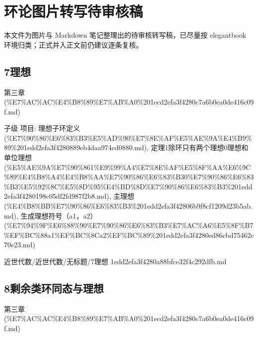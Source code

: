 \chapter{环论图片转写待审核稿}

\begin{dxtips}

本文件为图片与 Markdown 笔记整理出的待审核转写稿，已尽量按 elegantbook 环境归类；正式并入正文前仍建议逐条复核。

\end{dxtips}

\section*{7理想}

\begin{note}[来源上级主题]

第三章 (\%E7\%AC\%AC\%E4\%B8\%89\%E7\%AB\%A0\%201ecd2efa3f4280c7a6b0ea0de416c09f.md)

\end{note}

\begin{note}[7理想]

子级 项目: 理想子环定义 (\%E7\%90\%86\%E6\%83\%B3\%E5\%AD\%90\%E7\%8E\%AF\%E5\%AE\%9A\%E4\%B9\%89\%201edd2efa3f4280889eb4daa974cd0880.md), 定理1除环只有两个理想0理想和单位理想 (\%E5\%AE\%9A\%E7\%90\%861\%E9\%99\%A4\%E7\%8E\%AF\%E5\%8F\%AA\%E6\%9C\%89\%E4\%B8\%A4\%E4\%B8\%AA\%E7\%90\%86\%E6\%83\%B30\%E7\%90\%86\%E6\%83\%B3\%E5\%92\%8C\%E5\%8D\%95\%E4\%BD\%8D\%E7\%90\%86\%E6\%83\%B3\%201edd2efa3f4280198c05df2fd987f2b8.md), 主理想 (\%E4\%B8\%BB\%E7\%90\%86\%E6\%83\%B3\%201edd2efa3f42806b9f8cf1209d23b5ab.md), 生成理想符号（a1，a2） (\%E7\%94\%9F\%E6\%88\%90\%E7\%90\%86\%E6\%83\%B3\%E7\%AC\%A6\%E5\%8F\%B7\%EF\%BC\%88a1\%EF\%BC\%8Ca2\%EF\%BC\%89\%201edd2efa3f4280ed86cbd75462c70e23.md)

\end{note}

\begin{note}[来源路径]

近世代数/近世代数/无标题/7理想 1edd2efa3f4280a88bfce32f4c292dfb.md

\end{note}

\section*{8剩余类环同态与理想}

\begin{note}[来源上级主题]

第三章 (\%E7\%AC\%AC\%E4\%B8\%89\%E7\%AB\%A0\%201ecd2efa3f4280c7a6b0ea0de416c09f.md)

\end{note}

